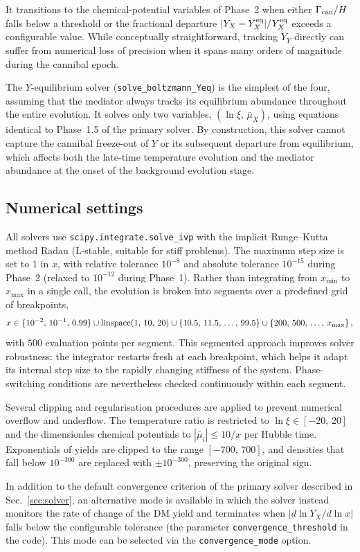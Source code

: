 It transitions to the chemical-potential variables of Phase~2 when either $\Gamma_{\rm can}/H$ falls below a threshold or the fractional departure $|Y_X - Y_X^{\rm eq}|/Y_X^{\rm eq}$ exceeds a configurable value. While conceptually straightforward, tracking $Y_Y$ directly can suffer from numerical loss of precision when it spans many orders of magnitude during the cannibal epoch.

The $Y$-equilibrium solver (\texttt{solve\_boltzmann\_Yeq}) is the simplest of the four, assuming that the mediator always tracks its equilibrium abundance throughout the entire evolution. It solves only two variables, $(\ln\xi,\,\bar\mu_X)$, using equations identical to Phase~1.5 of the primary solver. By construction, this solver cannot capture the cannibal freeze-out of $Y$ or its subsequent departure from equilibrium, which affects both the late-time temperature evolution and the mediator abundance at the onset of the background evolution stage.

\subsection{Numerical settings}
\label{app:num_details}

All solvers use \texttt{scipy.integrate.solve\_ivp} with the implicit Runge--Kutta method Radau (L-stable, suitable for stiff problems). The maximum step size is set to $1$ in $x$, with relative tolerance $10^{-8}$ and absolute tolerance $10^{-15}$ during Phase~2 (relaxed to $10^{-12}$ during Phase~1). Rather than integrating from $x_{\min}$ to $x_{\max}$ in a single call, the evolution is broken into segments over a predefined grid of breakpoints,
\begin{equation}
    x \in \{10^{-2},\, 10^{-1},\, 0.99\} \cup \mathrm{linspace}(1,\,10,\,20) \cup \{10.5,\, 11.5,\, \ldots,\, 99.5\} \cup \{200,\, 500,\, \ldots,\, x_{\rm max}\}\,,
\end{equation}
with $500$ evaluation points per segment. This segmented approach improves solver robustness: the integrator restarts fresh at each breakpoint, which helps it adapt its internal step size to the rapidly changing stiffness of the system. Phase-switching conditions are nevertheless checked continuously within each segment.

Several clipping and regularisation procedures are applied to prevent numerical overflow and underflow. The temperature ratio is restricted to $\ln\xi \in [-20,\,20]$ and the dimensionles chemical potentials to $|\bar\mu_i| \leq 10/x$ per Hubble time. Exponentials of yields are clipped to the range $[-700,\,700]$, and densities that fall below $10^{-300}$ are replaced with $\pm 10^{-300}$, preserving the original sign.

In addition to the default convergence criterion of the primary solver described in Sec.~\ref{sec:solver}, an alternative mode is available in which the solver instead monitors the rate of change of the DM yield and terminates when $|d\ln Y_X/d\ln x|$ falls below the configurable tolerance (the parameter \texttt{convergence\_threshold} in the code). This mode can be selected via the \texttt{convergence\_mode} option.
